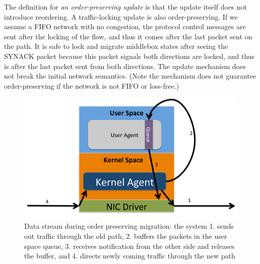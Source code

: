 The definition for \textit{an order-preserving update} is that the update itself does not introduce reordering. A traffic-locking update is also order-preserving. If we assume a FIFO network with no congestion, the protocol control messages are sent after the locking of the flow, and thus it comes after the last packet sent on the path. It is safe to lock and migrate middlebox states after seeing the SYNACK packet because this packet signals both directions are locked, and thus is after the last packet sent from both directions. The update mechanism does not break the initial network semantics. (Note the mechanism does not guarantee order-preserving if the network is not FIFO or loss-free.) 

\begin{figure}[ht]
\centering
\includegraphics[width=\linewidth]{figures/flowstream.pdf} 

\caption{\small Data stream during order preserving migration: the system 1. sends out traffic through the old path, 2. buffers the packets in the user space queue, 3. receives notification from the other side and releases the buffer, and 4. directs newly coming traffic through the new path}\label{flowstream}
\end{figure}




